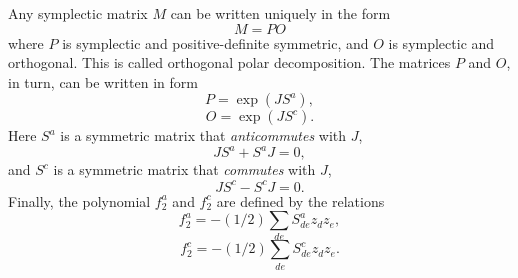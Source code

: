 Any symplectic matrix $M$ can be written uniquely in the form
\begin{equation}
M = PO
\end{equation}
where $P$ is symplectic and positive-definite symmetric, and $O$ is symplectic and orthogonal.  This is called orthogonal polar decomposition.  The matrices $P$ and $O$, in turn, can be written in form
\begin{equation}
P = \exp (JS^a),
\end{equation}
\begin{equation}
O = \exp (JS^c).
\end{equation}
Here $S^a$ is a symmetric matrix that {\em anticommutes} with $J$,
\begin{equation}
JS^a + S^aJ = 0,
\end{equation}
and $S^c$ is a symmetric matrix that {\em commutes} with $J$,
\begin{equation}
JS^c - S^cJ = 0.
\end{equation}
Finally, the polynomial $f^a_2$ and $f^c_2$ are defined by the relations
\begin{equation}
f^a_2 = -(1/2) \sum_{de} S^a_{de} z_d z_e,
\end{equation}
\begin{equation}
f^c_2 = -(1/2) \sum_{de} S^c_{de} z_d z_e.
\end{equation}

\newpage
